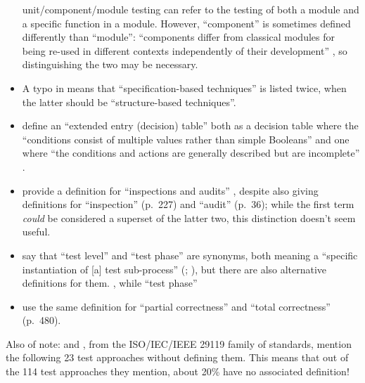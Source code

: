 \begin{itemize}
            unit/component/module testing can refer to the testing of both a
            module and a specific function in a module.
            However, ``component'' is sometimes defined differently than
            ``module'': ``components differ from classical modules for being
            re-used in different contexts independently of their development''
            \citep[p.~107]{BaresiAndPezzè2006}, so distinguishing the two
            may be necessary.
            \ifnotpaper
      \item A typo in \citep[Fig.~2]{IEEE2021} means that ``specification-based
            techniques'' is listed twice, when the latter should be
            ``structure-based techniques''.
      \item \citeauthor{IEEE2021} define an ``extended entry (decision) table''
            both as a decision table where the ``conditions consist of multiple
            values rather than simple Booleans'' \citeyearpar[p.~18]{IEEE2021}
            and one where ``the conditions and actions are generally described
            but are incomplete'' \citeyearpar[p.~175]{IEEE2017}.
      \item \citeauthor*{IEEE2017} provide a definition for ``inspections and
            audits'' \citeyearpar[p.~228]{IEEE2017}, despite also giving
            definitions for ``inspection'' (p.~227) and ``audit'' (p.~36);
            while the first term \emph{could} be considered a superset of the
            latter two, this distinction doesn't seem useful.
      \item \citeauthor*{IEEE2017} say that ``test level'' and ``test phase''
            are synonyms, both meaning a ``specific instantiation of [a] test
            sub-process'' (\citeyear[pp.~469,~470]{IEEE2017};
            \citeyear[p.~9]{IEEE2013}), but there are also alternative
            definitions for them. \procLevel{\citeyearpar}, while
            ``test phase'' \phaseDef{}
      \item \citeauthor{IEEE2017} use the same definition for ``partial correctness''
            \citeyearpar[p.~314]{IEEE2017} and ``total correctness'' (p.~480).
            \fi
\end{itemize}

\ifnotpaper
      Also of note: \citep{IEEE2022} and \citeyearpar{IEEE2021}, from the
      ISO/IEC/IEEE 29119 family of standards, mention the following 23 test
      approaches without defining them. This means that out of the 114 test
      approaches they mention, about 20\% have no associated definition!

